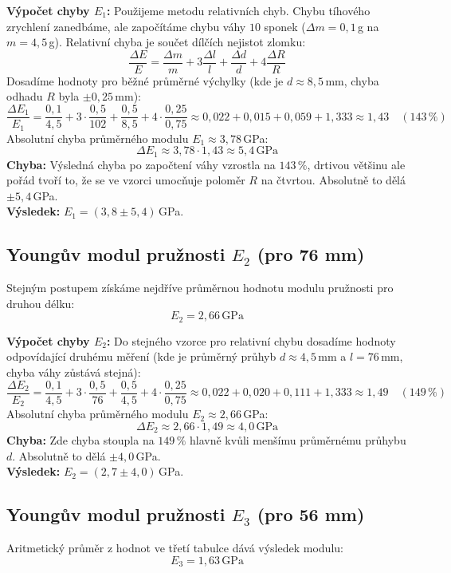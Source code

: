 \documentclass[a4paper,12pt]{article}
\begin{document}
\vspace{5mm}
\textbf{Výpočet chyby $E_1$:} Použijeme metodu relativních chyb. Chybu tíhového zrychlení zanedbáme, ale započítáme chybu váhy $10$ sponek ($\Delta m = 0,1$\,g na $m = 4,5$\,g). Relativní chyba je součet dílčích nejistot zlomku:
$$ \frac{\Delta E}{E} = \frac{\Delta m}{m} + 3\frac{\Delta l}{l} + \frac{\Delta d}{d} + 4\frac{\Delta R}{R} $$
Dosadíme hodnoty pro běžné průměrné výchylky (kde je $d \approx 8,5$\,mm, chyba odhadu $R$ byla $\pm 0,25$\,mm):
$$ \frac{\Delta E_1}{E_1} = \frac{0,1}{4,5} + 3 \cdot \frac{0,5}{102} + \frac{0,5}{8,5} + 4 \cdot \frac{0,25}{0,75} \approx 0,022 + 0,015 + 0,059 + 1,333 \approx 1,43 \quad (143\,\%) $$
Absolutní chyba průměrného modulu $E_1 \approx 3,78$\,GPa:
$$ \Delta E_1 \approx 3,78 \cdot 1,43 \approx 5,4\,\text{GPa} $$
\textbf{Chyba:} Výsledná chyba po započtení váhy vzrostla na $143\,\%$, drtivou většinu ale pořád tvoří to, že se ve vzorci umocňuje poloměr $R$ na čtvrtou. Absolutně to dělá $\pm 5,4$\,GPa. \\
\textbf{Výsledek:} $E_1 = (3,8 \pm 5,4)$\,GPa.

\subsection{Youngův modul pružnosti $E_2$ (pro 76 mm)}
Stejným postupem získáme nejdříve průměrnou hodnotu modulu pružnosti pro druhou délku:
$$ E_2 = 2,66\,\text{GPa} $$

\vspace{5mm}
\textbf{Výpočet chyby $E_2$:} Do stejného vzorce pro relativní chybu dosadíme hodnoty odpovídající druhému měření (kde je průměrný průhyb $d \approx 4,5$\,mm a $l = 76$\,mm, chyba váhy zůstává stejná):
$$ \frac{\Delta E_2}{E_2} = \frac{0,1}{4,5} + 3 \cdot \frac{0,5}{76} + \frac{0,5}{4,5} + 4 \cdot \frac{0,25}{0,75} \approx 0,022 + 0,020 + 0,111 + 1,333 \approx 1,49 \quad (149\,\%) $$
Absolutní chyba průměrného modulu $E_2 \approx 2,66$\,GPa:
$$ \Delta E_2 \approx 2,66 \cdot 1,49 \approx 4,0\,\text{GPa} $$
\textbf{Chyba:} Zde chyba stoupla na $149\,\%$ hlavně kvůli menšímu průměrnému průhybu $d$. Absolutně to dělá $\pm 4,0$\,GPa. \\
\textbf{Výsledek:} $E_2 = (2,7 \pm 4,0)$\,GPa.

\subsection{Youngův modul pružnosti $E_3$ (pro 56 mm)}
Aritmetický průměr z hodnot ve třetí tabulce dává výsledek modulu:
$$ E_3 = 1,63\,\text{GPa} $$
\end{document}
